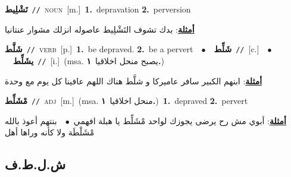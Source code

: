 \documentclass[10pt,a4paper,twoside]{article} %
\begin{document}
\begin{multicols}{2}
{\setlength\topsep{0pt}\textbf{\foreignlanguage{arabic}{تَشْلِيط}}\ {\color{gray}\texttt{//}\color{black}}\ \textsc{noun}\ [m.]\ \textbf{1.}~depravation  \textbf{2.}~perversion\  \begin{flushright}\color{gray}\foreignlanguage{arabic}{\textbf{\underline{\foreignlanguage{arabic}{أمثلة}}}: بدك تشوف التَشْلِيط عاصوله انزلك مشوار عنتانيا}\end{flushright}\color{black}} \vspace{2mm}

{\setlength\topsep{0pt}\textbf{\foreignlanguage{arabic}{شَلَّط}}\ {\color{gray}\texttt{//}\color{black}}\ \textsc{verb}\ [p.]\ \textbf{1.}~be depraved.  \textbf{2.}~be a pervert\ \ $\bullet$\ \ \setlength\topsep{0pt}\textbf{\foreignlanguage{arabic}{شَلِّط}}\ {\color{gray}\texttt{//}\color{black}}\ [c.]\ \ $\bullet$\ \ \setlength\topsep{0pt}\textbf{\foreignlanguage{arabic}{يشَلِّط}}\ {\color{gray}\texttt{//}\color{black}}\ [i.]\ \color{gray}(msa. \foreignlanguage{arabic}{يصبح منحل اخلاقيا}~\foreignlanguage{arabic}{\textbf{١.}})\color{black}\  \begin{flushright}\color{gray}\foreignlanguage{arabic}{\textbf{\underline{\foreignlanguage{arabic}{أمثلة}}}: ابنهم الكبير سافر عاميركا و شلَّط هناك اللهم عافينا كل يوم مع وحدة}\end{flushright}\color{black}} \vspace{2mm}

{\setlength\topsep{0pt}\textbf{\foreignlanguage{arabic}{مْشَلِّط}}\ {\color{gray}\texttt{//}\color{black}}\ \textsc{adj}\ [m.]\ \color{gray}(msa. \foreignlanguage{arabic}{منحل اخلاقيا}~\foreignlanguage{arabic}{\textbf{١.}})\color{black}\ \textbf{1.}~depraved  \textbf{2.}~pervert\  \begin{flushright}\color{gray}\foreignlanguage{arabic}{\textbf{\underline{\foreignlanguage{arabic}{أمثلة}}}: أبوي مش رح يرضى يجوزك لواحد مْشَلِّط يا هبلة افهمي\ $\bullet$\ \  بنتهم أعوذ بالله مْشَلْطَة ولا كأنه وراها أهل}\end{flushright}\color{black}} \vspace{2mm}

\vspace{-3mm}
\subsection*{\color{blue}\foreignlanguage{arabic}{ش.ل.ط.ف}\color{blue}{}} 


\end{multicols}
\end{document}
